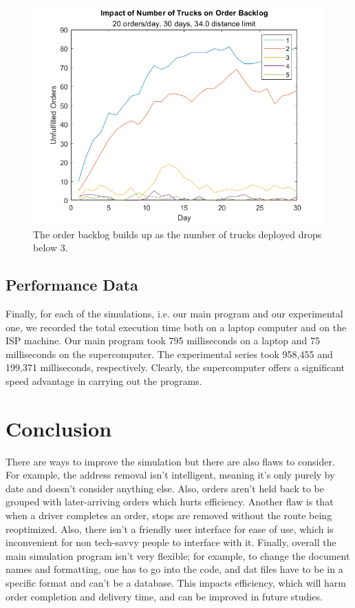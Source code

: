 \documentclass[letterpaper]{article}
\begin{document}
    \begin{figure}[h]
        \centering
        \caption{The order backlog builds up as the number of trucks deployed drops below 3.}
        \label{img:experiment2}
        \includegraphics[width=\textwidth]{experiment2.png}
    \end{figure}

    \subsection{Performance Data}
    \label{subsection:Performance_Data}
    Finally, for each of the simulations, i.e. our main program and our experimental one, we recorded the total execution time both on a laptop computer and on the ISP machine. Our main program took 795 milliseconds on a laptop and 75 milliseconds on the supercomputer. The experimental series took 958,455 and 199,371 milliseconds, respectively. Clearly, the supercomputer offers a significant speed advantage in carrying out the programs.

    \section{Conclusion}
    \label{section:Conclusion}
    There are ways to improve the simulation but there are also flaws to consider. For example, the address removal isn’t intelligent, meaning it’s only purely by date and doesn't consider anything else. Also, orders aren’t held back to be grouped with later-arriving orders which hurts efficiency. Another flaw is that when a driver completes an order, stops are removed without the route being reoptimized. Also, there isn’t a friendly user interface for ease of use, which is inconvenient for non tech-savvy people to interface with it. Finally, overall the main simulation program isn’t very flexible; for example, to change the document names and formatting, one has to go into the code, and dat files have to be in a specific format and can’t be a database. This impacts efficiency, which will harm order completion and delivery time, and can be improved in future studies. 
\end{document}
